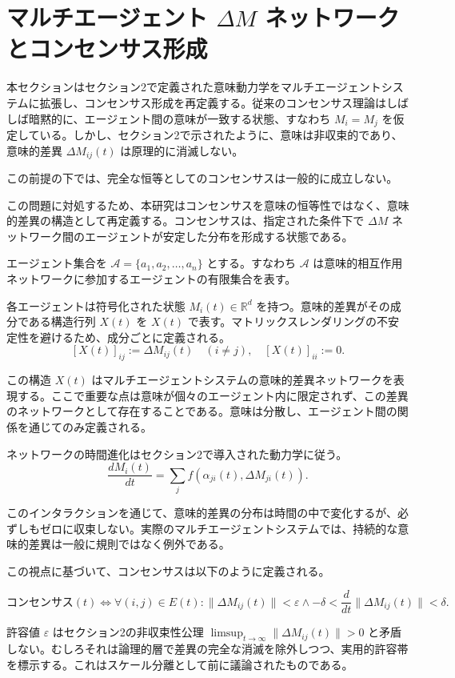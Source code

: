 \documentclass[11pt,a4paper]{article}
\theoremstyle{definition}
\begin{document}
\section{マルチエージェント $\Delta M$ ネットワークとコンセンサス形成}

本セクションはセクション2で定義された意味動力学をマルチエージェントシステムに拡張し、コンセンサス形成を再定義する。従来のコンセンサス理論はしばしば暗黙的に、エージェント間の意味が一致する状態、すなわち $M_i = M_j$ を仮定している。しかし、セクション2で示されたように、意味は非収束的であり、意味的差異 $\Delta M_{ij}(t)$ は原理的に消滅しない。

この前提の下では、完全な恒等としてのコンセンサスは一般的に成立しない。

この問題に対処するため、本研究はコンセンサスを意味の恒等性ではなく、意味的差異の構造として再定義する。コンセンサスは、指定された条件下で $\Delta M$ ネットワーク間のエージェントが安定した分布を形成する状態である。

エージェント集合を $\mathcal{A} = \{a_1, a_2, \ldots, a_n\}$ とする。すなわち $\mathcal{A}$ は意味的相互作用ネットワークに参加するエージェントの有限集合を表す。

各エージェントは符号化された状態 $M_i(t) \in \mathbb{R}^d$ を持つ。意味的差異がその成分である構造行列 $X(t)$ を $X(t)$ で表す。マトリックスレンダリングの不安定性を避けるため、成分ごとに定義される。
\[
[X(t)]_{ij} := \Delta M_{ij}(t) \quad (i \neq j), \quad [X(t)]_{ii} := 0.
\]

この構造 $X(t)$ はマルチエージェントシステムの意味的差異ネットワークを表現する。ここで重要な点は意味が個々のエージェント内に限定されず、この差異のネットワークとして存在することである。意味は分散し、エージェント間の関係を通じてのみ定義される。

ネットワークの時間進化はセクション2で導入された動力学に従う。
\[
\frac{dM_i(t)}{dt} = \sum_j f(\alpha_{ji}(t), \Delta M_{ji}(t)).
\]

このインタラクションを通じて、意味的差異の分布は時間の中で変化するが、必ずしもゼロに収束しない。実際のマルチエージェントシステムでは、持続的な意味的差異は一般に規則ではなく例外である。

この視点に基づいて、コンセンサスは以下のように定義される。

\[
\text{コンセンサス}(t) \Leftrightarrow \forall (i,j) \in E(t) : \|\Delta M_{ij}(t)\| < \varepsilon \land -\delta < \frac{d}{dt}\|\Delta M_{ij}(t)\| < \delta.
\]

許容値 $\varepsilon$ はセクション2の非収束性公理 $\limsup_{t \to \infty} \|\Delta M_{ij}(t)\| > 0$ と矛盾しない。むしろそれは論理的層で差異の完全な消滅を除外しつつ、実用的許容帯を標示する。これはスケール分離として前に議論されたものである。
\end{document}
